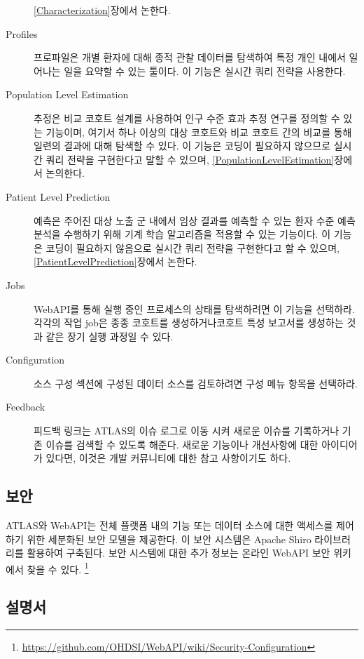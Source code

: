 \documentclass[10.5pt]{book}
\let\rmarkdownfootnote\footnote%
\def\footnote{\protect\rmarkdownfootnote}
\theoremstyle{definition}
\theoremstyle{definition}
\theoremstyle{definition}
\theoremstyle{remark}
\begin{document}
\begin{description}
\ref{Characterization}장에서 논한다.
\item[Profiles \index{ATLAS!profiles}]
프로파일은 개별 환자에 대해 종적 관찰 데이터를 탐색하여 특정 개인 내에서
일어나는 일을 요약할 수 있는 툴이다. 이 기능은 실시간 쿼리 전략을
사용한다.
\item[Population Level Estimation
\index{ATLAS!population level estimation}]
추정은 비교 코호트 설계를 사용하여 인구 수준 효과 추정 연구를 정의할 수
있는 기능이며, 여기서 하나 이상의 대상 코호트와 비교 코호트 간의 비교를
통해 일련의 결과에 대해 탐색할 수 있다. 이 기능은 코딩이 필요하지
않으므로 실시간 쿼리 전략을 구현한다고 말할 수 있으며,
\ref{PopulationLevelEstimation}장에서 논의한다.
\item[Patient Level Prediction \index{ATLAS!patient level prediction}]
예측은 주어진 대상 노출 군 내에서 임상 결과를 예측할 수 있는 환자 수준
예측 분석을 수행하기 위해 기계 학습 알고리즘을 적용할 수 있는 기능이다.
이 기능은 코딩이 필요하지 않음으로 실시간 쿼리 전략을 구현한다고 할 수
있으며, \ref{PatientLevelPrediction}장에서 논한다.
\item[Jobs \index{ATLAS!jobs}]
WebAPI를 통해 실행 중인 프로세스의 상태를 탐색하려면 이 기능을 선택하라.
각각의 작업 job은 종종 코호트를 생성하거나코호트 특성 보고서를 생성하는
것과 같은 장기 실행 과정일 수 있다.
\item[Configuration \index{ATLAS!configuration}]
소스 구성 섹션에 구성된 데이터 소스를 검토하려면 구성 메뉴 항목을
선택하라.
\item[Feedback \index{ATLAS!feedback}]
피드백 링크는 ATLAS의 이슈 로그로 이동 시켜 새로운 이슈를 기록하거나
기존 이슈를 검색할 수 있도록 해준다. 새로운 기능이나 개선사항에 대한
아이디어가 있다면, 이것은 개발 커뮤니티에 대한 참고 사항이기도 하다.
\end{description}

\subsection{보안}

ATLAS와 WebAPI는 전체 플랫폼 내의 기능 또는 데이터 소스에 대한 액세스를
제어하기 위한 세분화된 보안 모델을 제공한다. 이 보안 시스템은 Apache
Shiro 라이브러리를 활용하여 구축된다. 보안 시스템에 대한 추가 정보는
온라인 WebAPI 보안 위키에서 찾을 수 있다. \footnote{\url{https://github.com/OHDSI/WebAPI/wiki/Security-Configuration}}

\subsection{설명서}
\end{document}
